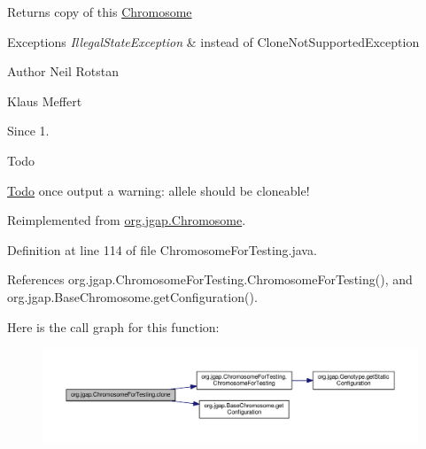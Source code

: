\begin{DoxyReturn}{Returns}
copy of this \hyperlink{classorg_1_1jgap_1_1_chromosome}{Chromosome} 
\end{DoxyReturn}

\begin{DoxyExceptions}{Exceptions}
{\em Illegal\-State\-Exception} & instead of Clone\-Not\-Supported\-Exception\\
\hline
\end{DoxyExceptions}
\begin{DoxyAuthor}{Author}
Neil Rotstan 

Klaus Meffert 
\end{DoxyAuthor}
\begin{DoxySince}{Since}
1. 
\end{DoxySince}
\begin{DoxyRefDesc}{Todo}
\item[\hyperlink{todo__todo000049}{Todo}]once output a warning\-: allele should be cloneable! \end{DoxyRefDesc}


Reimplemented from \hyperlink{classorg_1_1jgap_1_1_chromosome_a9f590d55a34d8b99c2a9a1b4aedd568b}{org.\-jgap.\-Chromosome}.



Definition at line 114 of file Chromosome\-For\-Testing.\-java.



References org.\-jgap.\-Chromosome\-For\-Testing.\-Chromosome\-For\-Testing(), and org.\-jgap.\-Base\-Chromosome.\-get\-Configuration().



Here is the call graph for this function\-:
\nopagebreak
\begin{figure}[H]
\begin{center}
\leavevmode
\includegraphics[width=350pt]{classorg_1_1jgap_1_1_chromosome_for_testing_acfcef639c3443fde7d324164050e3e19_cgraph}
\end{center}
\end{figure}


